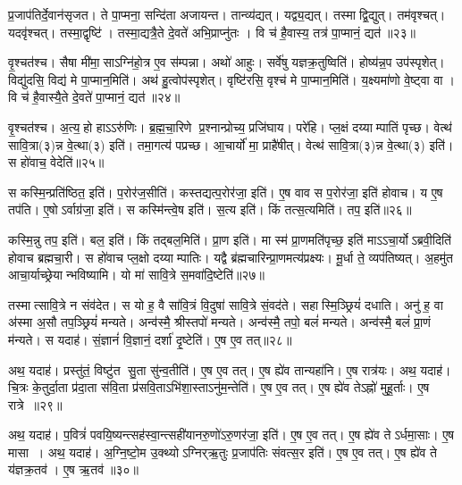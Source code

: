    प्र॒जाप॑तिर्दे॒वान॑सृजत।
   ते पा॒प्मना॒ सन्दि॑ता अजायन्त।
   तान्व्य॑द्यत्।
   यद्व्य॒द्यत्।
   तस्माद्वि॒द्युत्।
   तम॑वृश्चत्।
   यदवृ॑श्चत्।
   तस्मा॒द्वृष्टि॑।
   तस्मा॒द्यत्रै॒ते दे॒वते॑ अभि॒प्राप्नु॑तः ।
   वि च॑ है॒वास्य॒ तत्र॑ पा॒प्मानं॒ द्यत॑॥२३॥

   वृ॒श्चत॑श्च।
   सैषा मी॑मा॒साऽग्नि॑हो॒त्र ए॒व स॑म्पन्ना।
   अथो॑ आहुः।
   सर्वे॑षु यज्ञक्र॒तुष्विति॑।
   होष्य॑न्न॒प उप॑स्पृशेत्।
   विद्यु॑दसि॒ विद्य॑ मे पा॒प्मान॒मिति॑।
   अथ॑ हु॒त्वोप॑स्पृशेत्।
   वृष्टि॑रसि॒ वृश्च॑ मे पा॒प्मान॒मिति॑।
   य॒क्ष्यमा॑णो वे॒ष्ट्वा वा।
   वि च॑ है॒वास्यै॒ते दे॒वते॑ पा॒प्मानं॒ द्यत॑॥२४॥

   वृ॒श्चत॑श्च।
   अ॒त्य॒हो हाऽऽरु॑णिः।
   ब्र॒ह्म॒चा॒रिणे प्र॒श्नान्प्रोच्य॒ प्रजि॑घाय।
   परे॑हि।
   प्ल॒क्षं दय्याम्पातिं पृच्छ।
   वेत्थ॑ सावि॒त्रा(३)न्न वे॒त्था(३) इति॑।
   तमा॒गत्य॑ पप्रच्छ।
   आ॒चार्यो॑ मा॒ प्राहै॑षीत्।
   वेत्थ॑ सावि॒त्रा(३)न्न वे॒त्था(३) इति॑।
   स हो॑वाच॒ वेदेति॑॥२५॥

   स कस्मि॒न्प्रति॑ष्ठित॒ इति॑।
   प॒रोर॑ज॒सीति॑।
   कस्तद्यत्प॒रोर॑जा॒ इति॑।
   ए॒ष वाव स प॒रोर॑जा॒ इति॑ होवाच।
   य ए॒ष तप॑ति।
   ए॒षोऽर्वाग्र॑जा॒ इति॑।
   स कस्मि॑न्त्वे॒ष इति॑।
   स॒त्य इति॑।
   किं तत्स॒त्यमिति॑।
   तप॒ इति॑॥२६॥

   कस्मि॒न्नु तप॒ इति॑।
   बल॒ इति॑।
   किं तद्बल॒मिति॑।
   प्रा॒ण इति॑।
   मा स्म॑ प्रा॒णमति॑पृच्छ॒ इति॑ माऽऽचा॒र्योऽब्रवी॒दिति॑ होवाच ब्रह्मचा॒री।
   स हो॑वाच प्ल॒क्षो दय्याम्पातिः।
   यद्वै ब्र॑ह्मचारिन्प्रा॒णमत्य॑प्रक्ष्यः।
   मू॒र्धा ते॒ व्यप॑तिष्यत्।
   अ॒हमु॑त आचा॒र्याच्छ्रेयान्भविष्यामि।
   यो मा॑ सावि॒त्रे स॒मवा॑दि॒ष्टेति॑॥२७॥

   तस्मात्सावि॒त्रे न संव॑देत।
   स यो ह॒ वै सा॑वि॒त्रं वि॒दुषा॑ सावि॒त्रे सं॒वद॑ते।
   सहास्मि॒ञ्छ्रियं॑ दधाति।
   अनु॑ ह॒ वा अ॑स्मा अ॒सौ तप॒ञ्छ्रियं॑ मन्यते।
   अन्व॑स्मै॒ श्रीस्तपो॑ मन्यते।
   अन्व॑स्मै॒ तपो॒ बलं॑ मन्यते।
   अन्व॑स्मै॒ बलं॑ प्रा॒णं म॑न्यते।
   स यदाह॑।
   सं॒ज्ञानं॑ वि॒ज्ञानं॒ दर्\mbox{}शा॑ दृ॒ष्टेति॑।
   ए॒ष ए॒व तत्॥२८॥

   अथ॒ यदाह॑।
   प्रस्तु॑तं॒ विष्टु॑त सु॒ता सु॑न्व॒तीति॑।
   ए॒ष ए॒व तत्।
   ए॒ष ह्ये॑व तान्यहा॑नि।
   ए॒ष रात्र॑यः।
   अथ॒ यदाह॑।
   चि॒त्रः के॒तुर्दा॒ता प्र॑दा॒ता स॑वि॒ता प्र॑सवि॒ताऽभि॑शा॒स्ताऽनु॑म॒न्तेति॑।
   ए॒ष ए॒व तत्।
   ए॒ष ह्ये॑व तेऽह्नो॑ मुहू॒र्ताः।
   ए॒ष रात्रे॥२९॥

   अथ॒ यदाह॑।
   प॒वित्रं॑ पवयि॒ष्यन्त्सह॑स्वा॒न्त्सही॑यानरु॒णो॑\-ऽरु॒णर॑जा॒ इति॑।
   ए॒ष ए॒व तत्।
   ए॒ष ह्ये॑व तेऽर्धमा॒साः।
   ए॒ष मासा।
   अथ॒ यदाह॑।
   अ॒ग्नि॒ष्टो॒म उ॒क्थ्योऽग्निर्{‌}ऋ॒तुः प्र॒जाप॑तिः संवत्स॒र इति॑।
   ए॒ष ए॒व तत्।
   ए॒ष ह्ये॑व ते य॑ज्ञक्र॒तव॑।
   ए॒ष ऋ॒तव॑॥३०॥

